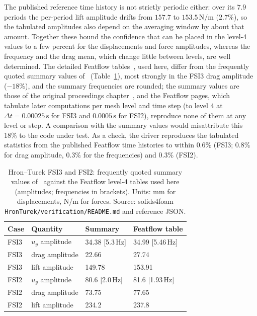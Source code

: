 The published reference time history is not strictly periodic either: over its $7.9$ periods the per-period lift amplitude drifts from $157.7$ to $153.5\,\mathrm{N/m}$ ($2.7\%$), so the tabulated amplitudes also depend on the averaging window by about that amount.
Together these bound the confidence that can be placed in the level-4 values to a few percent for the displacements and force amplitudes, whereas the frequency and the drag mean, which change little between levels, are well determined.
The detailed Featflow tables~\citep{FeatflowFSI,Turek2010}, used here, differ from the frequently quoted summary values of~\citet{Turek2006} (Table~\ref{tab:hronturek_ref}), most strongly in the FSI3 drag amplitude ($-18\%$), and the summary frequencies are rounded; the summary values are those of the original proceedings chapter~\citep{Turek2006}, and the Featflow pages, which tabulate later computations per mesh level and time step (to level 4 at $\Delta t = 0.00025\,\mathrm{s}$ for FSI3 and $0.0005\,\mathrm{s}$ for FSI2), reproduce none of them at any level or step. A comparison with the summary values would misattribute this $18\%$ to the code under test.
As a check, the driver reproduces the tabulated statistics from the published Featflow time histories to within $0.6\%$ (FSI3; $0.8\%$ for drag amplitude, $0.3\%$ for the frequencies) and $0.3\%$ (FSI2).

\begin{table}[htbp]
	\centering
	\small
	\setlength{\tabcolsep}{5pt}
	\caption{Hron--Turek FSI3 and FSI2: frequently quoted summary values of~\citet{Turek2006} against the Featflow level-4 tables used here (amplitudes; frequencies in brackets). Units: mm for displacements, N/m for forces. Source: solids4foam \texttt{HronTurek/verification/README.md} and reference JSON.}
	\label{tab:hronturek_ref}
	\begin{tabular}{llll}
		\toprule
		Case & Quantity & Summary~\citep{Turek2006} & Featflow table \\
		\midrule
		FSI3 & $u_y$ amplitude & 34.38 [5.3\,Hz] & 34.99 [5.46\,Hz] \\
		FSI3 & drag amplitude & 22.66 & 27.74 \\
		FSI3 & lift amplitude & 149.78 & 153.91 \\
		FSI2 & $u_y$ amplitude & 80.6 [2.0\,Hz] & 81.6 [1.93\,Hz] \\
		FSI2 & drag amplitude & 73.75 & 77.65 \\
		FSI2 & lift amplitude & 234.2 & 237.8 \\
		\bottomrule
	\end{tabular}
\end{table}

